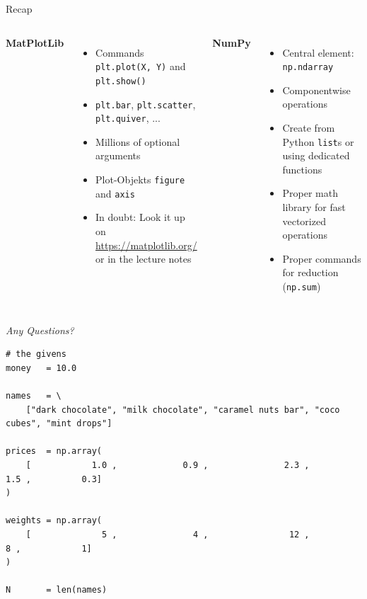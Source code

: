 
\begin{frame}[t,plain]
\titlepage
\end{frame}


\begin{frame}{Recap}
%
\begin{columns}[T]
\textbf{MatPlotLib}
\begin{itemize}
\item Commands \texttt{plt.plot(X, Y)} and \texttt{plt.show()}
\item \texttt{plt.bar}, \texttt{plt.scatter}, \texttt{plt.quiver}, ...
\item Millions of optional arguments
\item Plot-Objekts \texttt{figure} and \texttt{axis}
\item In doubt: Look it up on \url{https://matplotlib.org/} or in the lecture notes
\end{itemize}
%
\textbf{NumPy}
\begin{itemize}
\item Central element: \texttt{np.ndarray}
\item Componentwise operations
\item Create from Python \texttt{list}s or using dedicated functions
\item Proper math library for fast vectorized operations
\item Proper commands for reduction (\eg \texttt{np.sum})
\end{itemize}

\end{columns}
%
\begin{center}
	\emph{Any Questions?}
\end{center}
%
\end{frame}


\begin{frame}[fragile]
%
\begin{codebox}
\begin{verbatim}
# the givens
money   = 10.0

names   = \
    ["dark chocolate", "milk chocolate", "caramel nuts bar", "coco cubes", "mint drops"] 

prices  = np.array(
    [            1.0 ,             0.9 ,               2.3 ,         1.5 ,          0.3]
)

weights = np.array(
    [              5 ,               4 ,                12 ,           8 ,            1]
)

N       = len(names)
\end{verbatim}
\end{codebox}
%
\end{frame}

